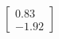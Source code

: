 \documentclass[preview]{standalone}
\begin{document}
\begin{align*}
\begin{bmatrix} 0.83 \\ -1.92 \end{bmatrix}
\end{align*}
\end{document}
